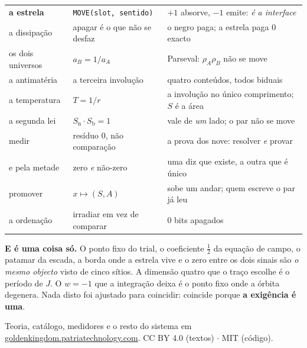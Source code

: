 \documentclass[11pt,a4paper]{article}
\newcommand{\code}[1]{\texttt{\small #1}}
\begin{document}
\begin{center}
\begin{tabular}{@{}p{3.1cm}p{4.4cm}p{7.4cm}@{}}
\textbf{a estrela} & \code{MOVE(slot,\,sentido)} & $+1$ absorve, $-1$ emite: \emph{é a interface} \\
a dissipação & apagar é o que não se desfaz & o negro paga; a estrela paga $0$ exacto \\
os dois universos & $a_B=1/a_A$ & Parseval: $\rho_A\rho_B$ não se move \\
a antimatéria & a terceira involução & quatro conteúdos, todos biduais \\
a temperatura & $T=1/r$ & a involução no único comprimento; $S$ é a área \\
a segunda lei & $S_{\text{n}}\!\cdot\!S_{\text{b}}=1$ & vale de \emph{um} lado; o par não se move \\
medir & resíduo $0$, não comparação & a prova dos nove: resolver \emph{e} provar \\
e pela metade & zero \emph{e} não-zero & uma diz que existe, a outra que é único \\
promover & $x\mapsto(S,A)$ & sobe um andar; quem escreve o par já leu \\
a ordenação & irradiar em vez de comparar & $0$ bits apagados \\
\bottomrule
\end{tabular}
\end{center}

\bigskip
\noindent \textbf{E é uma coisa só.} O ponto fixo do trial, o coeficiente $\tfrac12$ da equação de
campo, o patamar da escada, a borda onde a estrela vive e o zero entre os dois sinais são
\emph{o mesmo objecto} visto de cinco sítios. A dimensão quatro que o traço escolhe é o período de
$J$. O $w=-1$ que a integração deixa é o ponto fixo onde a órbita degenera. Nada disto foi
ajustado para coincidir: coincide porque \textbf{a exigência é uma}.

\vfill
{\footnotesize\color{cinza}\noindent
Teoria, catálogo, medidores e o resto do sistema em
\href{https://goldenkingdom.patriatechnology.com}{goldenkingdom.patriatechnology.com}.
CC BY 4.0 (textos) $\cdot$ MIT (código).\par}
\end{document}
